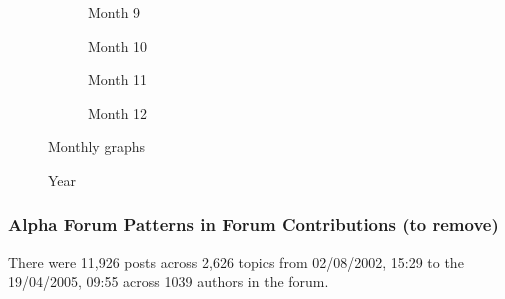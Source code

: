 \begin{figure}[htbp]
  \vspace{0.25cm}

  \begin{subfigure}[b]{0.24\textwidth}
    
      \caption{Month 9}
      \label{fig:month9}
  \end{subfigure}
  \hfill
  \begin{subfigure}[b]{0.24\textwidth}
    
      \caption{Month 10}
      \label{fig:month10}
  \end{subfigure}
  \hfill
  \begin{subfigure}[b]{0.24\textwidth}
    
      \caption{Month 11}
      \label{fig:month11}
  \end{subfigure}
  \hfill
  \begin{subfigure}[b]{0.24\textwidth}
    
      \caption{Month 12}
      \label{fig:month12}
  \end{subfigure}
  
  \caption{Monthly graphs}
  \label{fig:monthlyGraphs}
\end{figure}


\begin{figure}[h!] 
  \centering 
  
  \caption{Year}
  \label{figure:year}  
\end{figure}


%

%

%

%


\newpage
\subsubsection{Alpha Forum Patterns in Forum Contributions (to remove)}
There were 11,926 posts across 2,626 topics from 02/08/2002, 15:29 to the 19/04/2005, 09:55 across 1039 authors in the forum.

